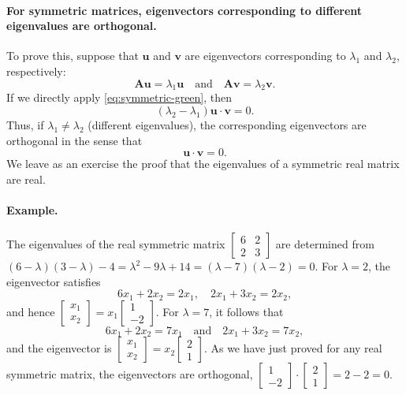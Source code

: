 \paragraph{For symmetric matrices, eigenvectors corresponding to different eigenvalues are orthogonal.}
To prove this, suppose that $\bm{u}$ and $\bm{v}$ are eigenvectors corresponding to $\lambda_1$ and $\lambda_2$, respectively:
\[
\bm{A}\bm{u} = \lambda_1\bm{u} \quad \text{and} \quad \bm{A}\bm{v} = \lambda_2\bm{v}.
\]
If we directly apply \eqref{eq:symmetric-green}, then
\[
(\lambda_2 - \lambda_1)\bm{u}\cdot\bm{v} = 0.
\]
Thus, if $\lambda_1 \neq \lambda_2$ (different eigenvalues), the corresponding eigenvectors are orthogonal in the sense that
\begin{equation}
\label{eq:ortho-vectors}
\bm{u}\cdot\bm{v} = 0.
\end{equation}
We leave as an exercise the proof that the eigenvalues of a symmetric real matrix are real.

\paragraph{Example.}
The eigenvalues of the real symmetric matrix $\begin{bmatrix} 6 & 2 \\ 2 & 3 \end{bmatrix}$ are determined from $(6 - \lambda)(3 - \lambda) - 4 = \lambda^2 - 9\lambda + 14 = (\lambda - 7)(\lambda - 2) = 0$.  For $\lambda = 2$, the eigenvector satisfies
\[
6x_1 + 2x_2 = 2x_1, \quad 2x_1 + 3x_2 = 2x_2,
\]
and hence $\begin{bmatrix} x_1 \\ x_2 \end{bmatrix} = x_1\begin{bmatrix} 1 \\ -2 \end{bmatrix}$.  For $\lambda = 7$, it follows that
\[
6x_1 + 2x_2 = 7x_1 \quad \text{and} \quad 2x_1 + 3x_2 = 7x_2,
\]
and the eigenvector is $\begin{bmatrix} x_1 \\ x_2 \end{bmatrix} = x_2\begin{bmatrix} 2 \\ 1 \end{bmatrix}$.  As we have just proved for any real symmetric matrix, the eigenvectors are orthogonal, $\begin{bmatrix} 1 \\ -2 \end{bmatrix}\cdot\begin{bmatrix} 2 \\ 1 \end{bmatrix} = 2 - 2 = 0$.

